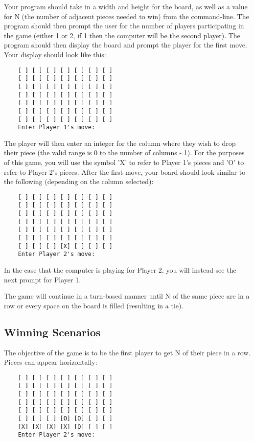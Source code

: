 \documentclass{article}
\begin{document}
Your program should take in a width and height for the board, as well as 
a value for N (the number of adjacent pieces needed to win)
from the command-line. The program should then 
prompt the user for the number of players participating in 
the game (either 1 or 2, if 1 then the computer will be the 
second player). The program should then display the board 
and prompt the player for the first move. Your display 
should look like this:

\begin{verbatim}
    [ ] [ ] [ ] [ ] [ ] [ ] [ ]
    [ ] [ ] [ ] [ ] [ ] [ ] [ ]
    [ ] [ ] [ ] [ ] [ ] [ ] [ ]
    [ ] [ ] [ ] [ ] [ ] [ ] [ ]
    [ ] [ ] [ ] [ ] [ ] [ ] [ ]
    [ ] [ ] [ ] [ ] [ ] [ ] [ ]
    [ ] [ ] [ ] [ ] [ ] [ ] [ ]
    Enter Player 1's move:
\end{verbatim}

The player will then enter an integer for the column 
where they wish to drop their piece (the valid range is 0 to the number of columns - 1). For the purposes of 
this game, you will use the symbol 'X' to refer to Player 1's 
pieces and 'O' to refer to Player 2's pieces. After the first 
move, your board should look similar to the following (depending 
on the column selected):

\begin{verbatim}
    [ ] [ ] [ ] [ ] [ ] [ ] [ ]
    [ ] [ ] [ ] [ ] [ ] [ ] [ ]
    [ ] [ ] [ ] [ ] [ ] [ ] [ ]
    [ ] [ ] [ ] [ ] [ ] [ ] [ ]
    [ ] [ ] [ ] [ ] [ ] [ ] [ ]
    [ ] [ ] [ ] [ ] [ ] [ ] [ ]
    [ ] [ ] [ ] [X] [ ] [ ] [ ]
    Enter Player 2's move:
\end{verbatim}

In the case that the computer is playing for Player 2, 
you will instead see the next prompt for Player 1. 

The game will continue in a turn-based manner until N of 
the same piece are in a row or every space on the board 
is filled (resulting in a tie). 

\subsection*{Winning Scenarios} 

The objective of the game is to be the first player to get N of 
their piece in a row. Pieces can appear horizontally:

\begin{verbatim}
    [ ] [ ] [ ] [ ] [ ] [ ] [ ]
    [ ] [ ] [ ] [ ] [ ] [ ] [ ]
    [ ] [ ] [ ] [ ] [ ] [ ] [ ]
    [ ] [ ] [ ] [ ] [ ] [ ] [ ]
    [ ] [ ] [ ] [ ] [ ] [ ] [ ]
    [ ] [ ] [ ] [O] [O] [ ] [ ]
    [X] [X] [X] [X] [O] [ ] [ ]
    Enter Player 2's move:
\end{verbatim}
\end{document}
